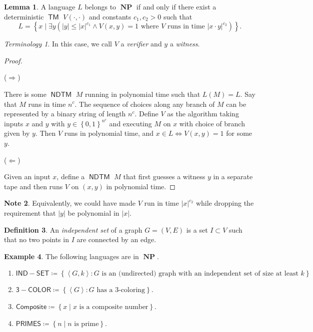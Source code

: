 \documentclass[10pt,letterpaper,cm]{nupset}
\theoremstyle{definition}
\newtheorem{definition}{Definition}[subsection]
\newtheorem{exmp}[definition]{Example}
\newtheorem{note}[definition]{Note}
\theoremstyle{theorem}
\newtheorem{lemma}[definition]{Lemma}
\theoremstyle{remark}
\newtheorem*{term}{Terminology}
\newcommand{\1}{\mathbf{1}}
\newcommand{\0}{\vec 0}
\DeclareMathOperator{\TM}{\mathsf{TM}}
\DeclareMathOperator{\NP}{\mathbf{NP}}
\DeclareMathOperator{\NDTM}{\mathsf{NDTM}}
\begin{document}
\begin{lemma}
A language $L$  belongs to $\NP$ if and only if there exist  a deterministic $\TM$ $V(\cdot, \cdot)$ and constants $c_1, c_2 >0$ such that $$L = \left\{ x \mid \exists y\left(\left\lvert{y}\right\rvert \leq \left\lvert{x}\right\rvert^{c_1} \land V\left(x,y\right) = 1 \text{ where } V \text{ runs in time }\left\lvert{x\cdot y}\right\rvert^{c_2}\right)\right\}.$$ 
\end{lemma}
\begin{term}
In this case, we call $V$ a \textit{verifier} and $y$ a \textit{witness}.
\end{term}
\begin{proof} $ $

\smallskip

($\Longrightarrow$) 

\smallskip

There is some $\NDTM$ $M$ running in polynomial time such that $L(M) = L$. Say that $M$ runs in time $n^c$. The sequence of choices along any branch of $M$ can be represented by a binary string of length $n^c$.
Define $V$ as the algorithm taking inputs $x$ and $y$ with $y\in  \left\{0,1\right\}^{n^c}$ and executing $M$ on $x$ with choice of branch given by $y$. Then $V$ runs in polynomial time, and $x\in L \iff V\left(x,y\right) =1$ for some $y$.

\medskip


($\Longleftarrow$)  

\smallskip

Given an input $x$, define a $\NDTM$ $M$ that first guesses a witness $y$ in a separate tape and then runs $V$ on $\left(x,y\right)$ in polynomial time. 
\end{proof}

\begin{note}
Equivalently, we could have made $V$ run in time $\left\lvert{x}\right\rvert^{c_2}$ while dropping the requirement that $\left\lvert{y}\right\rvert$ be polynomial in $\left\lvert{x}\right\rvert$. 
\end{note}

\begin{definition}
An \textit{independent set} of a graph $G=\left(V, E\right)$ is a set $I\subset V$ such that no two points in $I$ are connected by an edge. 
\end{definition}

\begin{exmp} The following languages are in $\NP$.
\begin{enumerate}
\item $\mathsf{IND{-}SET} \coloneqq \left\{\left\langle G, k \right\rangle : G\text{ is an (undirected) graph with an independent set of size at least }k\right\}$
\item $\mathsf{3{-}COLOR}\coloneqq \left\{ \left\langle G \right\rangle : G\text{ has a }3\text{-coloring}\right\}$.
\item $\mathsf{Composite} \coloneqq \left\{x \mid x\text{ is a composite number}\right\}$.
\item $\mathsf{PRIMES}\coloneqq \left\{ n \mid n\text{ is prime}\right\}$.
\end{enumerate}
\end{exmp}
\end{document}
